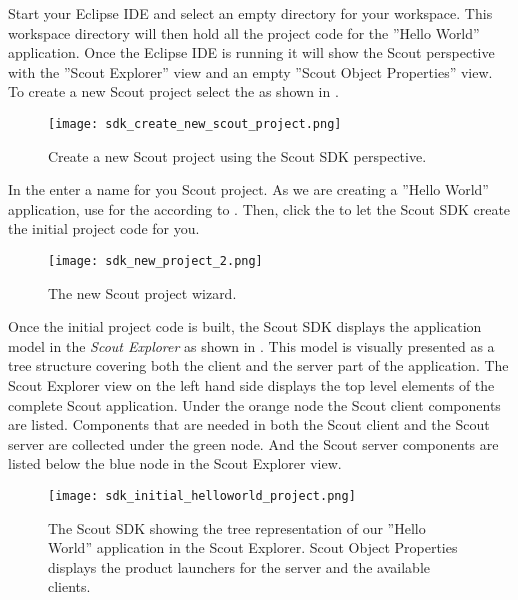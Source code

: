%

Start your Eclipse IDE and select an empty directory for your workspace. 
This workspace directory will then hold all the project code for the ''Hello World'' application. 
Once the Eclipse IDE is running it will show the Scout perspective with the ''Scout Explorer'' view and an empty ''Scout Object Properties'' view.
To create a new Scout project select the  as shown in .

\begin{figure}
\texttt{[image: sdk\_create\_new\_scout\_project.png]}
\caption{Create a new Scout project using the Scout SDK perspective.}
\end{figure}

In the  enter a name for you Scout project. 
As we are creating a ''Hello World'' application, use  for the  according to .
Then, click the  to let the Scout SDK create the initial project code for you.

\begin{figure}
\texttt{[image: sdk\_new\_project\_2.png]}
\caption{The new Scout project wizard.}
\end{figure}

Once the initial project code is built, the Scout SDK displays the application model in the \textit{Scout Explorer} as shown in .
This model is visually presented as a tree structure covering both the client and the server part of the application.
The Scout Explorer view on the left hand side displays the top level elements of the complete Scout application.
Under the orange node the Scout client components are listed. 
Components that are needed in both the Scout client and the Scout server are collected under the green node.
And the Scout server components are listed below the blue node in the Scout Explorer view.

\begin{figure}
\texttt{[image: sdk\_initial\_helloworld\_project.png]}
\caption{The Scout SDK showing the tree representation of our ''Hello World'' application in the Scout Explorer.
Scout Object Properties displays the product launchers for the server and the available clients.}
\end{figure}


